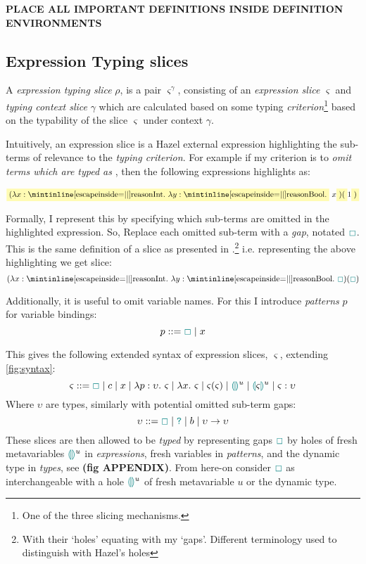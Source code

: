 \textbf{PLACE ALL IMPORTANT DEFINITIONS INSIDE DEFINITION ENVIRONMENTS}

\subsection{Expression Typing slices}\label{sec:ExpressionTypingSlices}
A \textit{expression typing slice} $\rho$, is a pair $\varsigma^\gamma$, consisting of an \textit{expression slice} $\varsigma$ and \textit{typing context slice} $\gamma$ which are calculated based on some typing \textit{criterion}\footnote{One of the three slicing mechanisms.} based on the typability of the slice $\varsigma$ under context $\gamma$. 

Intuitively, an expression slice is a Hazel external expression highlighting the sub-terms of relevance to the \textit{typing criterion}. For example if my criterion is to \textit{omit terms which are typed as} , then the following expressions highlights as:

\[\hlcmaths[yellow!30]{(\lambda x: \code{Int}.\ \lambda y : \code{Bool}.}\ x\hlcmaths[yellow!30]{)(}1\hlcmaths[yellow!30]{)}\]

Formally, I represent this by specifying which sub-terms are omitted in the highlighted expression. So, Replace each omitted sub-term with a \textit{gap}, notated $\gap$. This is the same definition of a slice as presented in \cite{FunctionalProgExplain}.\footnote{With their `holes' equating with my `gaps'. Different terminology used to distinguish with Hazel's holes} i.e. representing the above highlighting we get slice:
\[(\lambda x : \code{Int}.\ \lambda y : \code{Bool}.\ \gap)(\gap)\]


Additionally, it is useful to omit variable names. For this I introduce \textit{patterns} $p$ for variable bindings: 
\[p ::= \gap \mid x\]

This gives the following extended syntax of expression slices, $\varsigma$, extending \cref{fig:syntax}:
\[\varsigma ::= \gap \mid  c \mid x \mid \lambda p : \upsilon.\ \varsigma \mid \lambda x.\ \varsigma \mid \varsigma(\varsigma) \mid \hole^u \mid \hole[\varsigma]^u \mid \varsigma : \upsilon\]
Where $\upsilon$ are types, similarly with potential omitted sub-term gaps:
\[\upsilon ::= \gap \mid \dyn \mid b \mid \upsilon \to \upsilon\]
These slices are then allowed to be \textit{typed} by representing gaps $\gap$ by holes of fresh metavariables $\hole^u$ in \textit{expressions}, fresh variables in \textit{patterns}, and the dynamic type in \textit{types}, see \textbf{(fig APPENDIX)}. From here-on consider $\gap$ as interchangeable with a hole $\hole^u$ of fresh metavariable $u$ or the dynamic type.

